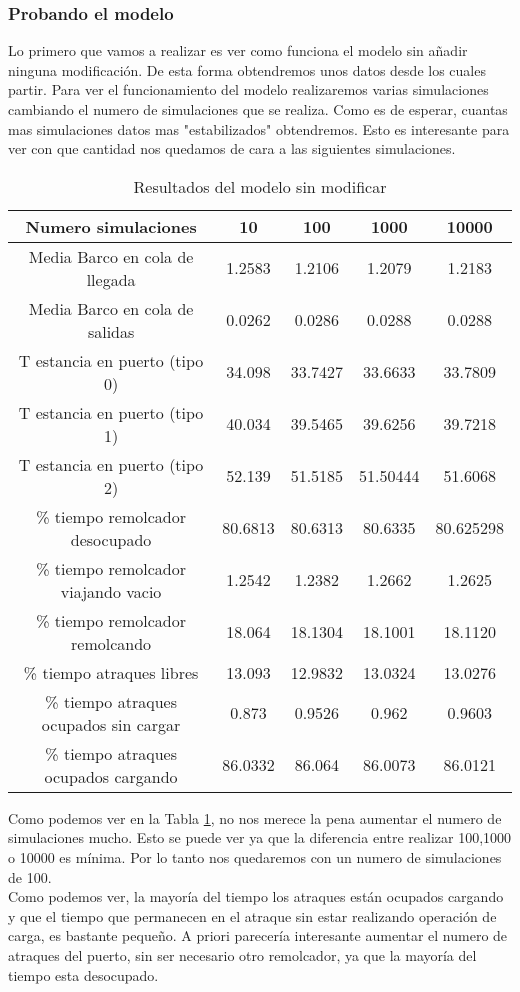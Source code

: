 \documentclass[12pt,a4paper]{article}
\begin{document}
\subsubsection{Probando el modelo}
Lo primero que vamos a realizar es ver como funciona el modelo sin añadir ninguna modificación. De esta forma obtendremos unos datos desde los cuales partir. Para ver el funcionamiento del modelo realizaremos varias simulaciones cambiando el numero de simulaciones que se realiza. Como es de esperar, cuantas mas simulaciones datos mas "estabilizados" obtendremos. Esto es interesante para ver con que cantidad nos quedamos de cara a las siguientes simulaciones.
\begin{table}[h]
	\centering
	\begin{tabular}{c|cccc}\toprule
		Numero simulaciones&10&100&1000&10000\\\midrule
		Media Barco en cola de llegada&1.2583&1.2106&1.2079&1.2183\\
		Media Barco en cola de salidas&0.0262&0.0286&0.0288&0.0288\\
		T estancia en puerto (tipo 0)&34.098&33.7427&33.6633&33.7809\\
		T estancia en puerto (tipo 1)&40.034&39.5465&39.6256&39.7218\\
		T estancia en puerto (tipo 2)&52.139&51.5185&51.50444&51.6068\\
		\% tiempo remolcador desocupado&80.6813&80.6313&80.6335&80.625298\\
		\% tiempo remolcador viajando vacio&1.2542&1.2382&1.2662&1.2625\\
		\% tiempo remolcador remolcando&18.064&18.1304&18.1001&18.1120\\
		\% tiempo atraques libres&13.093&12.9832&13.0324&13.0276\\
		\% tiempo atraques ocupados sin cargar&0.873&0.9526&0.962&0.9603\\
		\% tiempo atraques ocupados cargando&86.0332&86.064&86.0073&86.0121\\
	\end{tabular}
	\caption{Resultados del modelo sin modificar} \label{tab:petrolero_1}
\end{table}
Como podemos ver en la Tabla \ref{tab:petrolero_1}, no nos merece la pena aumentar el numero de simulaciones mucho. Esto se puede ver ya que la diferencia entre realizar 100,1000 o 10000 es mínima. Por lo tanto nos quedaremos con un numero de simulaciones de 100. \\
Como podemos ver, la mayoría del tiempo los atraques están ocupados cargando y que el tiempo que permanecen en el atraque  sin estar realizando operación de carga, es bastante pequeño. A priori parecería interesante aumentar el numero de atraques del puerto, sin ser necesario otro remolcador, ya que la mayoría del tiempo esta desocupado.
\end{document}
